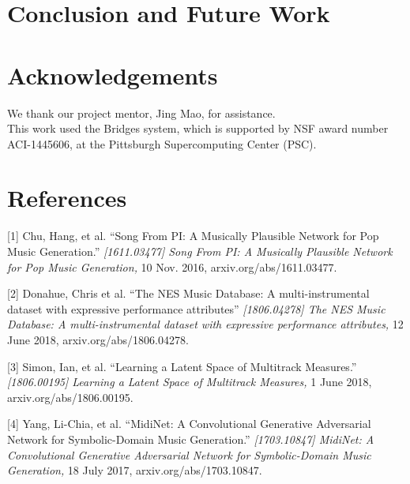 \documentclass{article}
\begin{document}



\section{Conclusion and Future Work}



\section{Acknowledgements}
We thank our project mentor, Jing Mao, for assistance.\\

This work used the Bridges system, which is supported by NSF award number ACI-1445606, at the Pittsburgh Supercomputing Center (PSC).

\section*{References}


\small

[1] Chu, Hang, et al. ``Song From PI: A Musically Plausible Network for Pop Music Generation.'' {\it [1611.03477] Song From PI: A Musically Plausible Network for Pop Music Generation,} 10 Nov. 2016, arxiv.org/abs/1611.03477.

[2] Donahue, Chris et al. ``The NES Music Database: A multi-instrumental dataset with expressive performance attributes'' {\it [1806.04278] The NES Music Database: A multi-instrumental dataset with expressive performance attributes,} 12 June 2018, arxiv.org/abs/1806.04278.

[3] Simon, Ian, et al. ``Learning a Latent Space of Multitrack Measures.'' {\it[1806.00195] Learning a Latent Space of Multitrack Measures,} 1 June 2018, arxiv.org/abs/1806.00195.

[4] Yang, Li-Chia, et al. ``MidiNet: A Convolutional Generative Adversarial Network for Symbolic-Domain Music Generation.'' {\it[1703.10847] MidiNet: A Convolutional Generative Adversarial Network for Symbolic-Domain Music Generation,} 18 July 2017, arxiv.org/abs/1703.10847.
\end{document}
